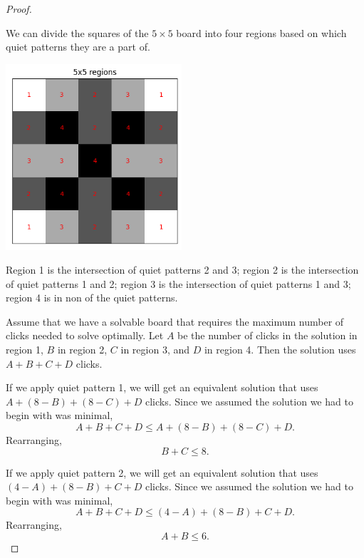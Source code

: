 \documentclass{article}
\begin{document}
\begin{proof}
\begin{center}
		\end{center}
		We can divide the squares of the $5 \times 5$ board into four regions based on which quiet patterns they are a part of.
		\begin{center}
			\includegraphics[width=0.49\textwidth]{../code/serialization/regions/5x5_regions.png}
		\end{center}
		Region 1 is the intersection of quiet patterns 2 and 3; region 2 is the intersection of quiet patterns 1 and 2; region 3 is the intersection of quiet patterns 1 and 3;
		region 4 is in non of the quiet patterns.
		
		Assume that we have a solvable board that requires the maximum number of clicks needed to solve optimally.
		Let $A$ be the number of clicks in the solution in region 1, $B$ in region 2, $C$ in region 3, and $D$ in region 4.
		Then the solution uses $A + B + C + D$ clicks.
		
		If we apply quiet pattern 1, we will get an equivalent solution that uses $A + (8 - B) + (8 - C) + D$ clicks.
		Since we assumed the solution we had to begin with was minimal,
		\begin{equation*}
			A + B + C + D \leq A + (8 - B) + (8 - C) + D.
		\end{equation*}
		Rearranging,
		\begin{equation}
			B + C \leq 8.
		\end{equation}
	
		If we apply quiet pattern 2, we will get an equivalent solution that uses $(4 - A) + (8 - B) + C + D$ clicks.
		Since we assumed the solution we had to begin with was minimal,
		\begin{equation*}
			A + B + C + D \leq (4 - A) + (8 - B) + C + D.
		\end{equation*}
		Rearranging,
		\begin{equation}
			A + B \leq 6.
		\end{equation}
	

\end{proof}
\end{document}

